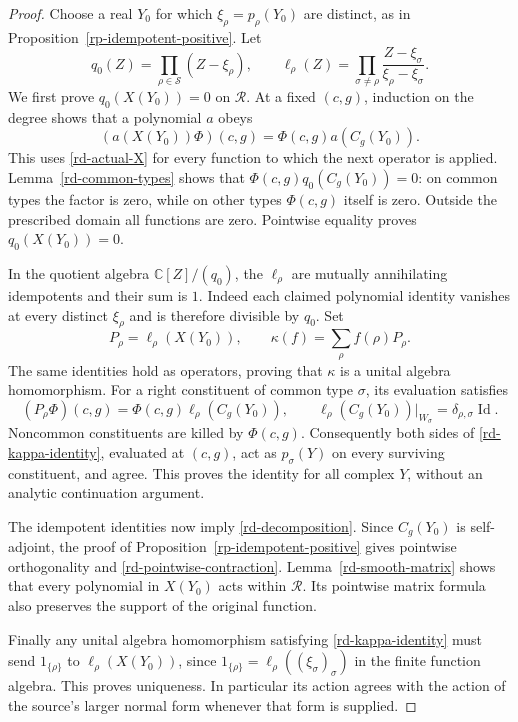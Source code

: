 \begin{proof}
Choose a real $Y_0$ for which
$\xi_\rho=p_\rho(Y_0)$ are distinct, as in
Proposition~\ref{rp-idempotent-positive}.
Let
\[
 q_0(Z)=\prod_{\rho\in\mathcal S}(Z-\xi_\rho),
 \qquad
 \ell_\rho(Z)=
       \prod_{\sigma\ne\rho}
           \frac{Z-\xi_\sigma}{\xi_\rho-\xi_\sigma}.
\]
We first prove $q_0(X(Y_0))=0$ on $\mathscr R$.
At a fixed $(c,g)$, induction on the degree shows
that a polynomial $a$ obeys
\[
 (a(X(Y_0))\Phi)(c,g)
                         =\Phi(c,g)a(C_g(Y_0)).
\]
This uses \eqref{rd-actual-X} for every function
to which the next operator is applied.
Lemma~\ref{rd-common-types} shows that
$\Phi(c,g)q_0(C_g(Y_0))=0$: on common types
the factor is zero, while on other types
$\Phi(c,g)$ itself is zero.
Outside the prescribed domain all functions
are zero.  Pointwise equality proves
$q_0(X(Y_0))=0$.

In the quotient algebra $\mathbb C[Z]/(q_0)$,
the $\ell_\rho$ are mutually annihilating
idempotents and their sum is $1$.
Indeed each claimed polynomial identity
vanishes at every distinct $\xi_\rho$ and
is therefore divisible by $q_0$.
Set
\[
     P_\rho=\ell_\rho(X(Y_0)),\qquad
     \kappa(f)=\sum_\rho f(\rho)P_\rho.
\]
The same identities hold as operators, proving
that $\kappa$ is a unital algebra homomorphism.
For a right constituent of common type $\sigma$,
its evaluation satisfies
\[
            (P_\rho\Phi)(c,g)
              =\Phi(c,g)\ell_\rho(C_g(Y_0)),
 \qquad
 \ell_\rho(C_g(Y_0))|_{W_\sigma}
                          =\delta_{\rho,\sigma}\operatorname{Id}.
\]
Noncommon constituents are killed by $\Phi(c,g)$.
Consequently both sides of
\eqref{rd-kappa-identity}, evaluated at $(c,g)$,
act as $p_\sigma(Y)$ on every surviving
constituent, and agree.  This proves the identity
for all complex $Y$, without an analytic
continuation argument.

The idempotent identities now imply
\eqref{rd-decomposition}.  Since $C_g(Y_0)$ is
self-adjoint, the proof of
Proposition~\ref{rp-idempotent-positive} gives
pointwise orthogonality and
\eqref{rd-pointwise-contraction}.
Lemma~\ref{rd-smooth-matrix} shows that every
polynomial in $X(Y_0)$ acts within $\mathscr R$.
Its pointwise matrix formula also preserves
the support of the original function.

Finally any unital algebra homomorphism satisfying
\eqref{rd-kappa-identity} must send $1_{\{\rho\}}$
to $\ell_\rho(X(Y_0))$, since
$1_{\{\rho\}}=\ell_\rho((\xi_\sigma)_\sigma)$
in the finite function algebra.  This proves
uniqueness.  In particular its action agrees
with the action of the source's larger normal
form whenever that form is supplied.
\end{proof}

